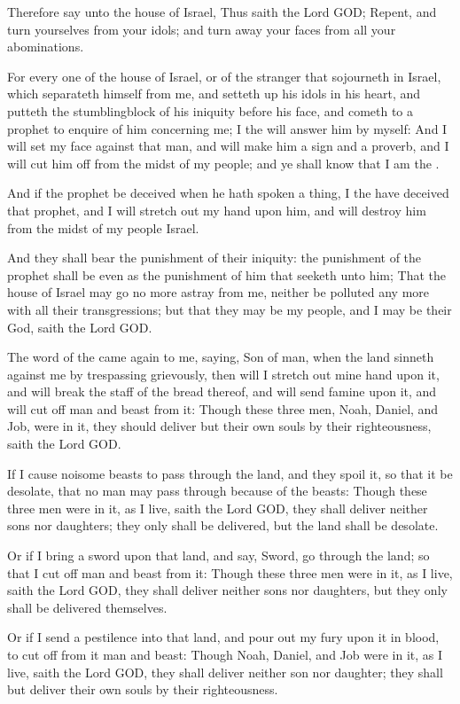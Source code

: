 \Verse Therefore say unto the house of Israel, Thus saith the Lord GOD; Repent, and turn yourselves from your idols; and turn away your faces from all your abominations.

\Verse For every one of the house of Israel, or of the stranger that sojourneth in Israel, which separateth himself from me, and setteth up his idols in his heart, and putteth the stumblingblock of his iniquity before his face, and cometh to a prophet to enquire of him concerning me; I the \LORD will answer him by myself: \Verse And I will set my face against that man, and will make him a sign and a proverb, and I will cut him off from the midst of my people; and ye shall know that I am the \LORD.

\Verse And if the prophet be deceived when he hath spoken a thing, I the \LORD have deceived that prophet, and I will stretch out my hand upon him, and will destroy him from the midst of my people Israel.

\Verse And they shall bear the punishment of their iniquity: the punishment of the prophet shall be even as the punishment of him that seeketh unto him; \Verse That the house of Israel may go no more astray from me, neither be polluted any more with all their transgressions; but that they may be my people, and I may be their God, saith the Lord GOD.

\Verse The word of the \LORD came again to me, saying, \Verse Son of man, when the land sinneth against me by trespassing grievously, then will I stretch out mine hand upon it, and will break the staff of the bread thereof, and will send famine upon it, and will cut off man and beast from it: \Verse Though these three men, Noah, Daniel, and Job, were in it, they should deliver but their own souls by their righteousness, saith the Lord GOD.

\Verse If I cause noisome beasts to pass through the land, and they spoil it, so that it be desolate, that no man may pass through because of the beasts: \Verse Though these three men were in it, as I live, saith the Lord GOD, they shall deliver neither sons nor daughters; they only shall be delivered, but the land shall be desolate.

\Verse Or if I bring a sword upon that land, and say, Sword, go through the land; so that I cut off man and beast from it: \Verse Though these three men were in it, as I live, saith the Lord GOD, they shall deliver neither sons nor daughters, but they only shall be delivered themselves.

\Verse Or if I send a pestilence into that land, and pour out my fury upon it in blood, to cut off from it man and beast: \Verse Though Noah, Daniel, and Job were in it, as I live, saith the Lord GOD, they shall deliver neither son nor daughter; they shall but deliver their own souls by their righteousness.

